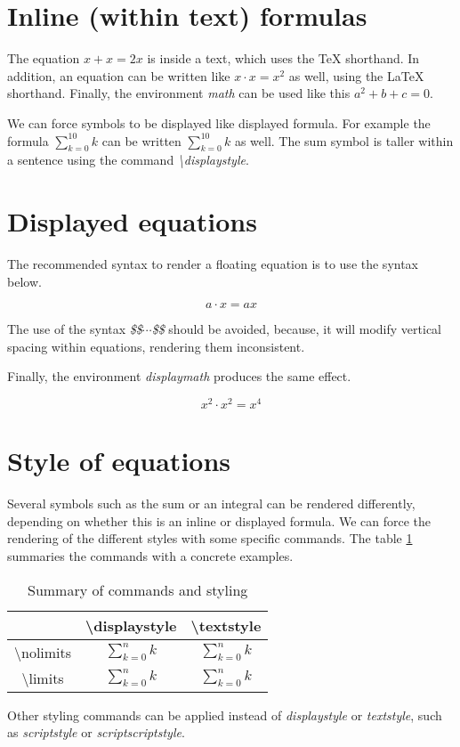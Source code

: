 \documentclass{article}
\begin{document}
\section*{Inline (within text) formulas}

The equation $x + x = 2x$ is inside a text, which uses the \TeX{} shorthand.
In addition, an equation can be written like \(x \cdot x = x^2\) as well, using the \LaTeX{} shorthand.
Finally, the environment \emph{math} can be used like this \begin{math}a^2 + b + c = 0\end{math}.

We can force symbols to be displayed like displayed formula. For example the formula $\sum_{k=0}^{10}k$ can be written $\displaystyle\sum_{k=0}^{10}k$ as well. The sum symbol is taller within a sentence using the command \emph{\textbackslash displaystyle}.

\section*{Displayed equations}

The recommended syntax to render a floating equation is to use the syntax below.

\[a \cdot x = ax \]

The use of the syntax \emph{\$\$$\cdots$\$\$} should be avoided, because, it will modify vertical spacing within equations, rendering them inconsistent.

Finally, the environment \emph{displaymath} produces the same effect.

\begin{displaymath}
	x^2 \cdot x^2 = x^4
\end{displaymath}

\section*{Style of equations}

Several symbols such as the sum or an integral can be rendered differently, depending on whether this is an inline or displayed formula. We can force the rendering of the different styles with some specific commands. The table \ref{table:custom-rendering} summaries the commands with a concrete examples.

\begin{table}[h]
	\centering
	\begin{tabular}{| c | c | c |}
		\hline
		& \textbackslash displaystyle & \textbackslash textstyle \\
		\hline
		\textbackslash nolimits	& $\displaystyle\sum\nolimits_{k=0}^{n}k$	& $\textstyle\sum\nolimits_{k=0}^{n}k$ \\
		\hline
		\textbackslash limits	& $\displaystyle\sum\limits_{k=0}^{n}k$	& $\textstyle\sum\limits_{k=0}^{n}k$ \\
		\hline
	\end{tabular}
	\caption{Summary of commands and styling}
	\label{table:custom-rendering}
\end{table}

Other styling commands can be applied instead of \emph{displaystyle} or \emph{textstyle}, such as \emph{scriptstyle} or \emph{scriptscriptstyle}.
\end{document}
